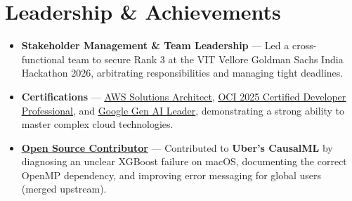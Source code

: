 \documentclass[a4paper,10pt]{article}
\newcommand{\ulink}[2]{\href{#1}{\uline{#2}}}
\begin{document}
\vspace{2pt}

\section{Leadership \& Achievements}
\vspace{2pt}
\begin{itemize}[nosep, leftmargin=1.5em, itemsep=1pt, topsep=2pt]
  \item {\color[HTML]{0A0A0A}\fontsize{11}{14}\selectfont \textbf{Stakeholder Management \& Team Leadership} --- Led a cross-functional team to secure Rank 3 at the VIT Vellore Goldman Sachs India Hackathon 2026, arbitrating responsibilities and managing tight deadlines.}
  \item {\color[HTML]{0A0A0A}\fontsize{11}{14}\selectfont \textbf{Certifications} --- \ulink{https://www.credly.com/badges/ee736e9c-48e5-4c68-9531-a910037530d3}{AWS Solutions Architect}, \ulink{https://catalog-education.oracle.com/ords/certview/sharebadge?id=8A188574B53FD87EB9A79BC2A5D51B1F6615D7E7B917A20D727F58032D75AD4A}{OCI 2025 Certified Developer Professional}, and \ulink{https://www.credly.com/badges/b225846a-6eda-43e7-8c19-e016faf8139c}{Google Gen AI Leader}, demonstrating a strong ability to master complex cloud technologies.}
  \item {\color[HTML]{0A0A0A}\fontsize{11}{14}\selectfont \ulink{https://github.com/su-jin1425/My-Open-Source-Contributions}{\textbf{Open Source Contributor}} --- Contributed to \textbf{Uber's CausalML} by diagnosing an unclear XGBoost failure on macOS, documenting the correct OpenMP dependency, and improving error messaging for global users (merged upstream).}
\end{itemize}
\end{document}
